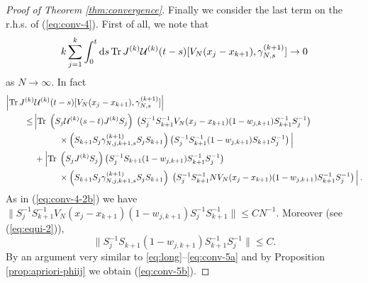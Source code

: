 \documentclass[11pt]{article}
\newcommand{\rd}{{\rm d}}
\newcommand{\cU}{{\cal U}}
\newcommand{\tr}{\mbox{Tr}}
\begin{document}
\begin{proof}[Proof of Theorem \ref{thm:convergence}]
Finally we consider the last term on the r.h.s. of
(\ref{eq:conv-4}). First of all, we note that
\begin{equation}\label{eq:conv-5b}
k \sum_{j=1}^k \int_0^t \rd s \, \tr \, J^{(k)} \cU^{(k)} (t-s) [
V_N (x_j -x_{k+1}) , \gamma_{N,s}^{(k+1)} ] \to 0
\end{equation}
as $N \to \infty$. In fact
\begin{equation}
\begin{split}
\Big| \tr \, J^{(k)} &\cU^{(k)} (t-s) [ V_N (x_j -x_{k+1}) ,
\gamma_{N,s}^{(k+1)} ] \Big| \\ \leq \, &\Big| \tr \; \left(S_j
\cU^{(k)} (s-t) J^{(k)} S_j \right)\; \left(S_j^{-1} S_{k+1}^{-1}
V_N
(x_j - x_{k+1}) (1- w_{j,k+1}) S_{k+1}^{-1} S_j^{-1} \right) \\
&\hspace{1cm} \times \left( S_{k+1} S_j \gamma^{(k+1)}_{N,j,k+1,s}
S_j S_{k+1}\right) \left(S_j^{-1} S_{k+1}^{-1} (1-w_{j,k+1})
S_{k+1} S_j^{-1}\right)\Big| \\
&+ \Big| \tr \; \left(S_j J^{(k)} S_j\right)
\left(S_j^{-1} S_{k+1} (1-w_{j,k+1}) S_{k+1}^{-1} S_j^{-1}\right) \\
&\hspace{1cm} \times \left(S_{k+1} S_j \gamma^{(k+1)}_{N,j,k+1,s}
S_j S_{k+1}\right) \; \left(S_j^{-1} S_{k+1}^{-1} N V_N (x_j -
x_{k+1}) (1- w_{j,k+1}) S_{k+1}^{-1} S_j^{-1}\right)\Big|\,.
\end{split}
\end{equation}
As in (\ref{eq:conv-4-2b}) we have $\| S_j^{-1} S_{k+1}^{-1} V_N
(x_j -x_{k+1}) (1-w_{j,k+1}) S_j^{-1} S_{k+1}^{-1} \| \leq C
N^{-1}$. Moreover (see (\ref{eq:equi-2})),
\begin{equation}
\| S_j^{-1} S_{k+1} (1-w_{j,k+1}) S_{k+1}^{-1} S_j^{-1} \| \leq C.
\end{equation}
By an argument very similar to \eqref{eq:long}--\eqref{eq:conv-5a}
and by Proposition \ref{prop:apriori-phiij} we obtain
(\ref{eq:conv-5b}).

\medskip


\end{proof}
\end{document}
